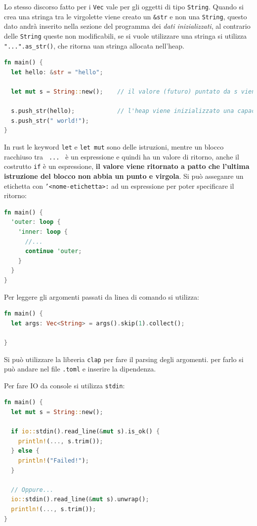 \documentclass[12pt]{article}
\begin{document}
Lo stesso discorso fatto per i \texttt{Vec} vale per gli oggetti di tipo \texttt{String}. Quando si crea una stringa tra le virgolette viene creato un \texttt{\&str} e non una \texttt{String}, questo dato andr\`a inserito nella sezione del programma dei \emph{dati inizializzati}, al contrario delle \texttt{String} queste non modificabili, se si vuole utilizzare una stringa si utilizza \texttt{"...".as\_str()}, che ritorna uan stringa allocata nell'heap.
\begin{lstlisting}[language=rust]
fn main() {
  let hello: &str = "hello";

  let mut s = String::new();    // il valore (futuro) puntato da s viene allocato nell'heap

  s.push_str(hello);            // l'heap viene inizializzato una capacita' ed un size uguale al size della stringa puntata da "hello"
  s.push_str(" world!");
}
\end{lstlisting}
In rust le keyword \texttt{let} e \texttt{let mut} sono delle istruzioni, mentre un blocco racchiuso tra \texttt{{ ... }} \`e un espressione e quindi ha un valore di ritorno, anche il costrutto \texttt{if} \`e un espressione, \textbf{il valore viene ritornato a patto che l'ultima istruzione del blocco non abbia un punto e virgola}. Si pu\`o asseganre un etichetta con \texttt{'<nome-etichetta>:} ad un espressione per poter specificare il ritorno:
\begin{lstlisting}[language=rust]
fn main() {
  'outer: loop {
    'inner: loop {
      //...
      continue 'outer;
    }
  }
}
\end{lstlisting}

Per leggere gli argomenti passati da linea di comando si utilizza:
\begin{lstlisting}[language=rust]
fn main() {
  let args: Vec<String> = args().skip(1).collect();

}
\end{lstlisting}
Si pu\`o utilizzare la libreria \texttt{clap} per fare il parsing degli argomenti. per farlo si pu\`o andare nel file \texttt{.toml} e inserire la dipendenza.


Per fare IO da console si utilizza \texttt{stdin}:
\begin{lstlisting}[language=rust]
fn main() {
  let mut s = String::new();

  if io::stdin().read_line(&mut s).is_ok() {
    println!(..., s.trim());
  } else {
    println!("Failed!");
  }

  // Oppure...
  io::stdin().read_line(&mut s).unwrap();
  println!(..., s.trim());
}
\end{lstlisting}
\end{document}

